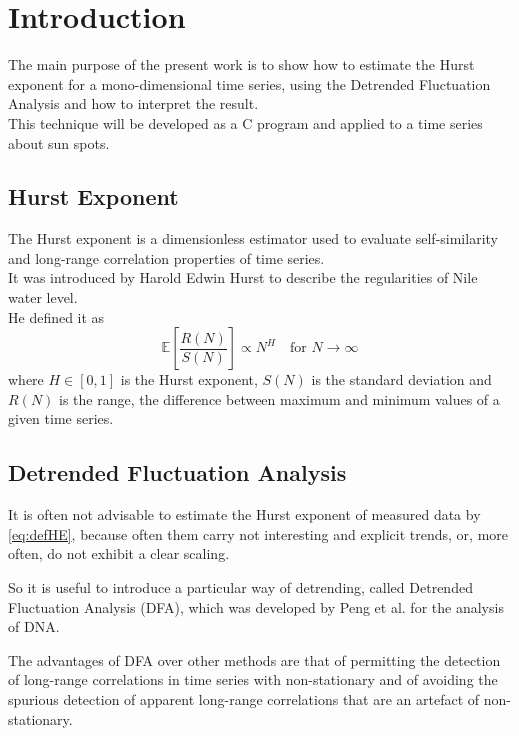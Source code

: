 \section{Introduction} 
The main purpose of the present work is to show how to estimate the Hurst exponent for a mono-dimensional time series, using the Detrended Fluctuation Analysis and how to interpret the result. \\
This technique will be developed as a C program and applied to a time series about sun spots.

\subsection{Hurst Exponent}
The Hurst exponent is a dimensionless estimator used to evaluate self-similarity and long-range correlation properties of time series. \\
It was introduced by Harold Edwin Hurst to describe the regularities of Nile water level. \\
He defined it as
\begin{equation}
\mathbb{E} \left[\frac{R(N)}{S(N)}\right] \propto N^{H} \quad \text{for } N \to \infty
\label{eq:defHE}
\end{equation}
where $H \in \left[0, 1 \right] $ is the Hurst exponent, $S (N)$ is the standard deviation and $R(N)$ is the range, the difference between maximum and minimum values of a given time series.

\subsection{Detrended Fluctuation Analysis}
It is often not advisable to estimate the Hurst exponent of measured data by \autoref{eq:defHE}, because often them carry not interesting and explicit trends, or, more often, do not exhibit a clear scaling.

So it is useful to introduce a particular way of detrending, called Detrended Fluctuation Analysis (DFA), which was developed by Peng et al. \cite{PhysRevE.49.1685} for the analysis of DNA.

The advantages of DFA over other methods are that of permitting the detection of long-range correlations in time series with non-stationary and of avoiding the spurious detection of apparent long-range correlations that are an artefact of non-stationary.
